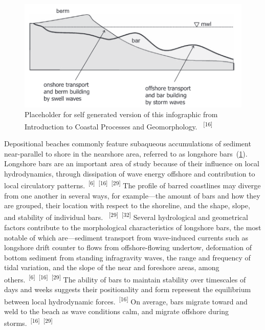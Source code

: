\documentclass{article}
\begin{document}
\begin{figure}
    \centering
    \includegraphics[width=.9\linewidth]{images/barred-profile.png}
    \caption{Placeholder for self generated version of this infographic from Introduction to Coastal Processes and Geomorphology. ~\textsuperscript{[16]}}
    \label{figure9}
\end{figure}


\par{Depositional beaches commonly feature subaqueous accumulations of sediment near-parallel to shore in the nearshore area, referred to as longshore bars~(\cref{figure9}). Longshore bars are an important area of study because of their influence on local hydrodynamics, through dissipation of wave energy offshore and contribution to local circulatory patterns.~\textsuperscript{[6]}~\textsuperscript{[16]}~\textsuperscript{[29]} The profile of barred coastlines may diverge from one another in several ways, for example---the amount of bars and how they are grouped, their location with respect to the shoreline, and the shape, slope, and stability of individual bars. ~\textsuperscript{[29]}~\textsuperscript{[32]} Several hydrological and geometrical factors contribute to the morphological characteristics of longshore bars, the most notable of which are---sediment transport from wave-induced currents such as longshore drift counter to flows from offshore-flowing undertow, deformation of bottom sediment from standing infragravity waves, the range and frequency of tidal variation, and the slope of the near and foreshore areas, among others.~\textsuperscript{[6]}~\textsuperscript{[16]}~\textsuperscript{[29]} The ability of bars to maintain stability over timescales of days and weeks suggests their positionality and form represent the equilibrium between local hydrodynamic forces.~\textsuperscript{[16]} On average, bars migrate toward and weld to the beach as wave conditions calm, and migrate offshore during storms.~\textsuperscript{[16]}~\textsuperscript{[29]}}
\end{document}
